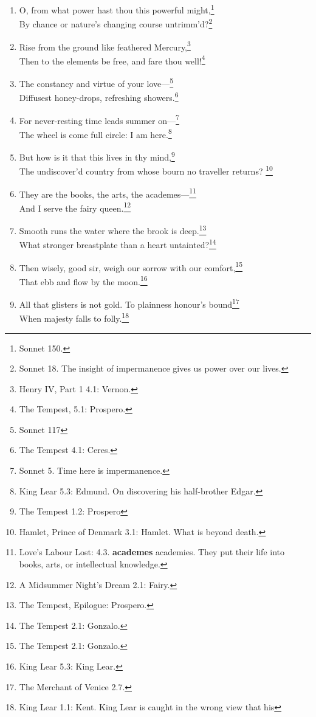 \documentclass[17pt,twoside]{extarticle}
\begin{document}
\begin{enumerate}
{    Bassanio. The stars.}
\item
  O, from what power hast thou this powerful might,\footnote{Sonnet 150.}\\By
  chance or nature's changing course untrimm'd?\footnote{Sonnet 18. The
    insight of impermanence gives us power over our lives.}
\item
  Rise from the ground like feathered Mercury,\footnote{Henry IV, Part 1
    4.1: Vernon.}\\Then to the elements be free, and fare thou
  well!\footnote{The Tempest, 5.1: Prospero.}
\item
  The constancy and virtue of your love---\footnote{Sonnet 117}\\Diffusest
  honey-drops, refreshing showers.\footnote{The Tempest 4.1: Ceres.}
\item
  For never-resting time leads summer on---\footnote{Sonnet 5. Time here
    is impermanence.}\\The wheel is come full circle: I am
  here.\footnote{King Lear 5.3: Edmund. On discovering his half-brother
    Edgar.}
\item
  But how is it that this lives in thy mind,\footnote{The Tempest 1.2:
    Prospero}\\The undiscover'd country from whose bourn no traveller
  returns? \footnote{Hamlet, Prince of Denmark 3.1: Hamlet. What is
    beyond death.}
\item
  They are the books, the arts, the academes---\footnote{Love's Labour
    Lost: 4.3. \textbf{academes} academies. They put their life into
    books, arts, or intellectual knowledge.}\\And I serve the fairy
  queen.\footnote{A Midsummer Night's Dream 2.1: Fairy.}
\item
  Smooth runs the water where the brook is deep.\footnote{The Tempest,
    Epilogue: Prospero.}\\What stronger breastplate than a heart
  untainted?\footnote{The Tempest 2.1: Gonzalo.}
\item
  Then wisely, good sir, weigh our sorrow with our comfort,\footnote{The
    Tempest 2.1: Gonzalo.}\\That ebb and flow by the moon.\footnote{King
    Lear 5.3: King Lear.}
\item
  All that glisters is not gold. To plainness honour's bound\footnote{The
    Merchant of Venice 2.7.}\\When majesty falls to folly.\footnote{King
    Lear 1.1: Kent. King Lear is caught in the wrong view that his
}
\end{enumerate}
\end{document}
